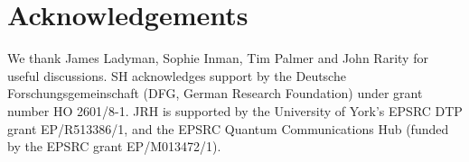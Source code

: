 \documentclass[superscriptaddress,floatfix,nofootinbib,12pt]{revtex4-2}
\begin{document}
\section{Acknowledgements}
We thank James Ladyman, Sophie Inman, Tim Palmer and John Rarity for useful discussions. 
SH acknowledges support by the Deutsche Forschungsgemeinschaft (DFG, German Research Foundation) under grant number HO 2601/8-1. JRH is supported by the University of York's EPSRC DTP grant EP/R513386/1, and the EPSRC Quantum Communications Hub (funded by the EPSRC grant EP/M013472/1).



\end{document}
